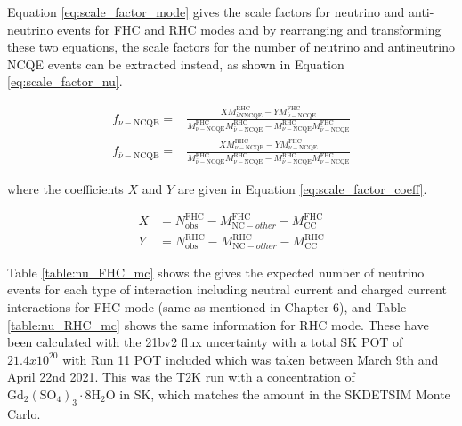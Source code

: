 Equation \ref{eq:scale_factor_mode} gives the scale factors for neutrino and anti-neutrino events for FHC and RHC modes and by rearranging and transforming these two equations, the scale factors for the number of neutrino and antineutrino NCQE events can be extracted instead, as shown in Equation \ref{eq:scale_factor_nu}. 

\begin{equation}
    \begin{aligned}
    f_{\nu-\mathrm{NCQE}}= & \frac{X M_{\bar{\nu} \mathrm{N} \mathrm{NCQE}}^{\mathrm{RHC}}-Y M_{\bar{\nu}-\mathrm{NCQE}}^{\mathrm{FHC}}}{M_{\nu-\mathrm{NCQE}}^{\mathrm{FHC}} M_{\bar{\nu}-\mathrm{NCQE}}^{\mathrm{RHC}}-M_{\nu-\mathrm{NCQE}}^{\mathrm{RHC}} M_{\bar{\nu}-\mathrm{NCQE}}^{\mathrm{FHC}}} \\
    f_{\bar{\nu}-\mathrm{NCQE}}= & \frac{X M_{\nu-\mathrm{NCQE}}^{\mathrm{RHC}}-Y M_{\nu-\mathrm{NCQE}}^{\mathrm{FHC}}}{M_{\bar{\nu}-\mathrm{NCQE}}^{\mathrm{FHC}} M_{\nu-\mathrm{NCQE}}^{\mathrm{RHC}}-M_{\bar{\nu}-\mathrm{NCQE}}^{\mathrm{RHC}} M_{\nu-\mathrm{NCQE}}^{\mathrm{FHC}}}
    \end{aligned}
\label{eq:scale_factor_nu}
\end{equation}

where the coefficients $X$ and $Y$ are given in Equation \ref{eq:scale_factor_coeff}.


\begin{equation}
    \begin{aligned}
    X & =N_{\mathrm{obs}}^{\mathrm{FHC}}-M_{\mathrm{NC}-o t h e r}^{\mathrm{FHC}}-M_{\mathrm{CC}}^{\mathrm{FHC}} \\
    Y & =N_{\mathrm{obs}}^{\mathrm{RHC}}-M_{\mathrm{NC}-o t h e r}^{\mathrm{RHC}}-M_{\mathrm{CC}}^{\mathrm{RHC}}
    \end{aligned}
\label{eq:scale_factor_coeff}
\end{equation}


Table \ref{table:nu_FHC_mc} shows the gives the expected number of neutrino events for each type of interaction including neutral current and charged current interactions for FHC mode (same as mentioned in Chapter 6), and Table \ref{table:nu_RHC_mc} shows the same information for RHC mode. These have been calculated with the 21bv2 flux uncertainty with a total SK POT of $21.4 x 10^{20}$ with Run 11 POT included which was taken between March 9th and April 22nd 2021. This was the T2K run with a concentration of $\mathrm{Gd}_{2}\left(\mathrm{SO}_{4}\right)_{3} \cdot 8 \mathrm{H}_{2} \mathrm{O}$ in SK, which matches the amount in the SKDETSIM Monte Carlo. 


